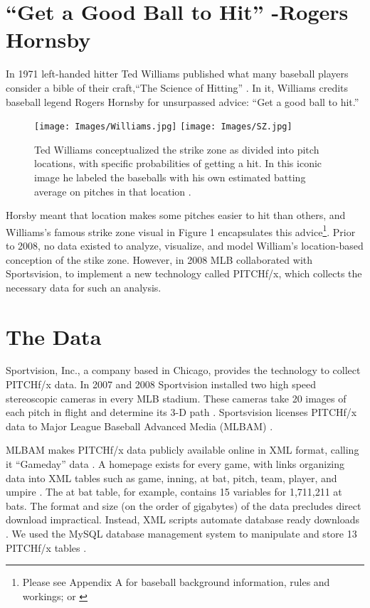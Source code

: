 \section{``Get a Good Ball to Hit'' -Rogers Hornsby}
In 1971 left-handed hitter Ted Williams published what many baseball players consider a bible of their craft,``The Science of Hitting'' \citep{Williams1971}. In it, Williams credits baseball legend Rogers Hornsby for unsurpassed advice: ``Get a good ball to hit.''
        \begin{figure}[H]
      	\centering
      	\texttt{[image: Images/Williams.jpg]} 
      	\texttt{[image: Images/SZ.jpg]}
      	\caption{Ted Williams conceptualized the strike zone as divided into pitch locations, with specific probabilities of getting a hit. In this iconic image he labeled the baseballs with his own estimated batting average on pitches in that location \citep{Williams1971}.}
      	\end{figure} 
Horsby meant that location makes some pitches easier to hit than others, and  Williams's famous strike zone visual in Figure 1 encapsulates this advice\footnote{Please see Appendix A for baseball background information, rules and workings; or \citep{Wiki}}. Prior to 2008, no data existed to analyze, visualize, and model William's location-based conception of the stike zone. However, in 2008 MLB collaborated with Sportsvision, to implement a new technology called PITCHf/x\textsuperscript{\textregistered}, which collects the necessary data for such an analysis.

\section{The Data} %
Sportvision, Inc., a company based in Chicago, provides the technology to collect PITCHf/x\textsuperscript{\textregistered} data. In 2007 and 2008 Sportvision installed two high speed stereoscopic cameras in every MLB\textsuperscript{\textregistered} stadium. These cameras take 20 images of each pitch in flight and determine its 3-D path \citep{Fast2010}. Sportsvision licenses PITCHf/x\textsuperscript{\textregistered} data to Major League Baseball Advanced Media (MLBAM\textsuperscript{\textregistered}) \citep{Baumer2010}. 

MLBAM\textsuperscript{\textregistered} makes PITCHf/x\textsuperscript{\textregistered} data publicly available online in XML format, calling it ``Gameday'' data \citep{Sievert2014}. A homepage exists for every game, with links organizing data into XML tables such as game, inning, at bat, pitch, team, player, and umpire \citep{Sievert2014}. The at bat table, for example, contains 15 variables for 1,711,211 at bats. The format and size (on the order of gigabytes) of the data precludes direct download impractical. Instead, XML scripts automate database ready downloads \citep{Adler2006}. We used the MySQL database management system to manipulate and store 13 PITCHf/x\textsuperscript{\textregistered} tables \citep{Tahaghoghi2006}. 

